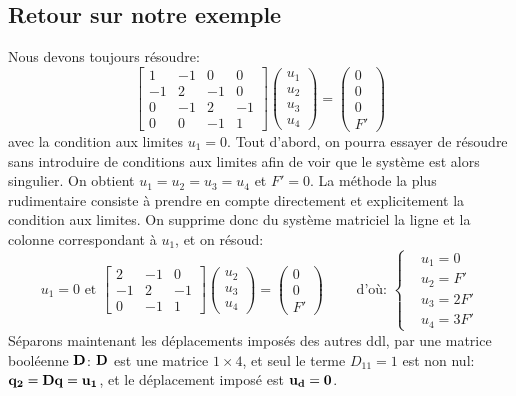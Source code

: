    \subsection{Retour sur notre exemple}
\fi
Nous devons toujours résoudre:
\begin{equation}
\begin{bmatrix} 1 & -1 & 0 & 0 \\ -1 & 2 & -1 & 0 \\ 0 & -1 & 2 & -1\\ 0&0&-1&1
\end{bmatrix}
\begin{pmatrix} u_1\\u_2\\u_3\\u_4 \end{pmatrix}
=
\begin{pmatrix} 0\\0\\0\\F' \end{pmatrix}
\end{equation}
avec la condition aux limites $u_1=0$.
\medskipvm
Tout d'abord, on pourra essayer de résoudre sans introduire de conditions aux limites afin de voir que le système est alors singulier. On obtient $u_1=u_2=u_3=u_4$ et $F'=0$.
\medskipvm
La méthode la plus rudimentaire consiste à prendre en compte directement et explicitement la condition aux limites.
On supprime donc du système matriciel la ligne et la colonne correspondant à $u_1$, et on résoud:
\begin{equation}\label{Eq-Base}
u_1=0 \text{ et }
\begin{bmatrix} 2 & -1 & 0 \\ -1 & 2 & -1\\ 0&-1&1 \end{bmatrix}
\begin{pmatrix} u_2\\u_3\\u_4 \end{pmatrix}
=
\begin{pmatrix} 0\\0\\F' \end{pmatrix}
\qquad \text{ d'où: } 
\left\{\begin{aligned} &u_1=0 \\ &u_2=F' \\ &u_3=2F' \\ &u_4=3F' \end{aligned}\right.
\end{equation}
\medskipvm
Séparons maintenant les déplacements imposés des autres ddl, par une matrice booléenne $\mathbf{D}$:
$\mathbf{D}$ est une matrice $1\times 4$, et seul le terme $D_{11}=1$ est non nul: $\mathbf{q_2}=\mathbf{D}\mathbf{q}=\mathbf{u_1}$,
et le déplacement imposé est $\mathbf{u_d}=\mathbf{0}$.

